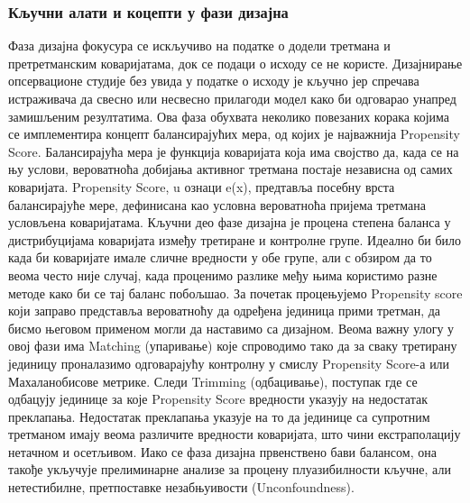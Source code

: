 \documentclass[12pt, a4paper]{article}
\begin{document}
\subsubsection{Кључни алати и коцепти у фази дизајна}
Фаза дизајна фокусура се искључиво на податке о додели третмана и претретманским коваријатама, док се подаци о исходу се не користе. Дизајнирање опсервационе студије без увида у податке о исходу је кључно јер спречава истраживача да свесно или несвесно прилагоди модел како би одговарао унапред замишљеним резултатима. 
Ова фаза обухвата неколико повезаних корака којима се имплементира концепт балансирајућих мера, од којих је најважнија Propensity Score. Балансирајућа мера је функција коваријата која има својство да, када се на њу услови, вероватноћа добијања активног третмана постаје независна од самих коваријата. Propensity Score, u ознаци e(x), предтавља посебну врста балансирајуће мере, дефинисана као условна вероватноћа пријема третмана условљена коваријатама.  
Кључни део фазе дизајна је процена степена баланса у дистрибуцијама коваријата између третиране и контролне групе. Идеално би било када би коваријате имале сличне вредности у обе групе, али с обзиром да то веома често није случај, када проценимо разлике међу њима користимо разне методе како би се тај баланс побољшао. За почетак  процењујемо Propensity score који заправо представља вероватноћу да одређена јединица прими третман, да бисмо његовом применом могли да наставимо са дизајном. Веома важну улогу у овој фази има  Matching (упаривање) које спроводимо тако да за сваку третирану јединицу проналазимо одговарајућу контролну у смислу Propensity Score-а или Махаланобисове метрике. Следи Trimming (одбацивање), поступак где се одбацују јединице за које Propensity Score вредности указују на недостатак преклапања. Недостатак преклапања указује на то да јединице са супротним третманом имају веома различите вредности коваријата, што чини екстраполацију нетачном и осетљивом. Иако се фаза дизајна првенствено бави балансом, она такође укључује прелиминарне анализе за процену плуазибилности кључне, али нетестибилне, претпоставке незабњуивости (Unconfoundness).
\end{document}
